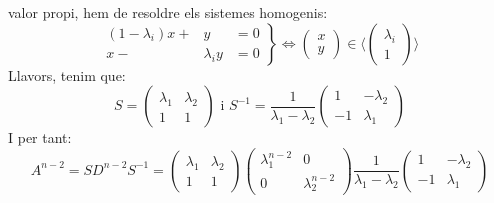 \documentclass[
  11pt,
]{book}
\numberwithin{dummy}{section}
\theoremstyle{maincolornumbox}
\theoremstyle{blacknumex}
\theoremstyle{blacknumbox}
\theoremstyle{maincolornum}
\begin{document}
valor propi, hem de resoldre els sistemes homogenis: \[\left.
\begin{array}{rrr}
    (1-\lambda_i) x + & y & =0 \\ x  - & \lambda_i y  &= 0
\end{array} \right\} \Longleftrightarrow \begin{pmatrix}
x \\ y 
\end{pmatrix} \in \langle \begin{pmatrix}
\lambda_i \\ 1
\end{pmatrix} \rangle\] Llavors, tenim que: \[S=
\begin{pmatrix}
\lambda_1 & \lambda_2 \\ 1 & 1
\end{pmatrix}
\text{ i }
S^{-1}=
\frac{1}{\lambda_1-\lambda_2}\begin{pmatrix}
1 & -\lambda_2 \\
-1 & \lambda_1
\end{pmatrix}
\] I per tant: \[A^{n-2}=SD^{n-2}S^{-1}=
\begin{pmatrix}
\lambda_1 & \lambda_2 \\ 1 & 1
\end{pmatrix}
\begin{pmatrix}
\lambda_1^{n-2} & 0 \\
0 & \lambda_2^{n-2}
\end{pmatrix}
\frac{1}{\lambda_1-\lambda_2}\begin{pmatrix}
1 & -\lambda_2 \\
-1 & \lambda_1
\end{pmatrix}
\]
\end{document}
